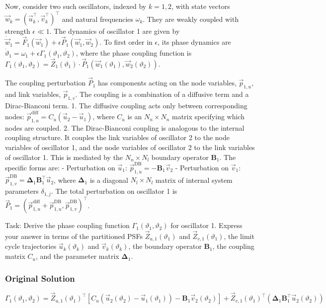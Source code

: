 \documentclass[10pt]{article}
\begin{document}
Now, consider two such oscillators, indexed by $k=1,2$, with state vectors $\vec{w}_k = (\vec{u}_k^\top, \vec{v}_k^\top)^\top$ and natural frequencies $\omega_k$. They are weakly coupled with strength $\epsilon \ll 1$. The dynamics of oscillator 1 are given by $\dot{\vec{w}}_1 = \vec{F}_1(\vec{w}_1) + \epsilon \vec{P}_1(\vec{w}_1, \vec{w}_2)$. To first order in $\epsilon$, its phase dynamics are $\dot{\vartheta}_1 = \omega_1 + \epsilon \Gamma_1(\vartheta_1, \vartheta_2)$, where the phase coupling function is $\Gamma_1(\vartheta_1, \vartheta_2) = \vec{Z}_1(\vartheta_1) \cdot \vec{P}_1(\vec{w}_1(\vartheta_1), \vec{w}_2(\vartheta_2))$.

The coupling perturbation $\vec{P}_1$ has components acting on the node variables, $\vec{p}_{1,u}$, and link variables, $\vec{p}_{1,v}$. The coupling is a combination of a diffusive term and a Dirac-Bianconi term.
1. The diffusive coupling acts only between corresponding nodes: $\vec{p}_{1,u}^{\text{diff}} = C_u(\vec{u}_2 - \vec{u}_1)$, where $C_u$ is an $N_n \times N_n$ matrix specifying which nodes are coupled.
2. The Dirac-Bianconi coupling is analogous to the internal coupling structure. It couples the link variables of oscillator 2 to the node variables of oscillator 1, and the node variables of oscillator 2 to the link variables of oscillator 1. This is mediated by the $N_n \times N_l$ boundary operator $\boldsymbol{B}_1$. The specific forms are:
   - Perturbation on $\vec{u}_1$: $\vec{p}_{1,u}^{\text{DB}} = - \boldsymbol{B}_1 \vec{v}_2$
   - Perturbation on $\vec{v}_1$: $\vec{p}_{1,v}^{\text{DB}} = \boldsymbol{\Delta}_1 \boldsymbol{B}_1^\top \vec{u}_2$, where $\boldsymbol{\Delta}_1$ is a diagonal $N_l \times N_l$ matrix of internal system parameters $\delta_{1,j}$.
The total perturbation on oscillator 1 is $\vec{P}_1 = (\vec{p}_{1,u}^{\text{diff}} + \vec{p}_{1,u}^{\text{DB}}, \vec{p}_{1,v}^{\text{DB}})^\top$.

Task:
Derive the phase coupling function $\Gamma_1(\vartheta_1, \vartheta_2)$ for oscillator 1. Express your answer in terms of the partitioned PSFs $\vec{Z}_{u,1}(\vartheta_1)$ and $\vec{Z}_{v,1}(\vartheta_1)$, the limit cycle trajectories $\vec{u}_k(\vartheta_k)$ and $\vec{v}_k(\vartheta_k)$, the boundary operator $\boldsymbol{B}_1$, the coupling matrix $C_u$, and the parameter matrix $\boldsymbol{\Delta}_1$.

\subsubsection*{Original Solution}
\[ \Gamma_1(\vartheta_1, \vartheta_2) = \vec{Z}_{u,1}(\vartheta_1)^\top \left[ C_u(\vec{u}_2(\vartheta_2) - \vec{u}_1(\vartheta_1)) - \boldsymbol{B}_1 \vec{v}_2(\vartheta_2) \right] + \vec{Z}_{v,1}(\vartheta_1)^\top \left( \boldsymbol{\Delta}_1 \boldsymbol{B}_1^\top \vec{u}_2(\vartheta_2) \right) \]
\end{document}
